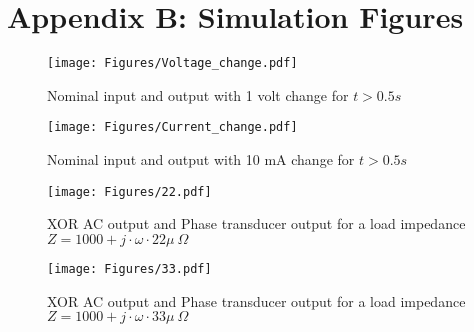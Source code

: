      \chapter{Appendix B: Simulation Figures} 

\begin{figure}[H]
    \centering
    \texttt{[image: Figures/Voltage\_change.pdf]}
    \caption{Nominal input and output with 1 volt change for $t>0.5s$}
    \label{fig:nomial_voltages}
\end{figure}

\begin{figure}[H]
    \centering
    \texttt{[image: Figures/Current\_change.pdf]}
     \caption{Nominal input and output with 10 mA change for $t>0.5s$}
    \label{fig:nominal_current}
\end{figure}

\begin{figure}[H]
  \centering
  \texttt{[image: Figures/22.pdf]}
    \caption{XOR AC output and Phase transducer output for a load impedance \\$Z=1000+j \cdot \omega \cdot 22\mu \  \Omega$ }
    \label{fig:phase22u}
\end{figure}

 \begin{figure}[H]
  \centering
  \texttt{[image: Figures/33.pdf]}
    \caption{XOR AC output and Phase transducer output for a load impedance \\$Z=1000+j \cdot \omega \cdot 33\mu \  \Omega$ }
    \label{fig:phase33u}
\end{figure}
